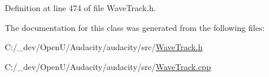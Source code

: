 Definition at line 474 of file Wave\+Track.\+h.



The documentation for this class was generated from the following files\+:\begin{DoxyCompactItemize}
\item 
C\+:/\+\_\+dev/\+Open\+U/\+Audacity/audacity/src/\hyperlink{_wave_track_8h}{Wave\+Track.\+h}\item 
C\+:/\+\_\+dev/\+Open\+U/\+Audacity/audacity/src/\hyperlink{_wave_track_8cpp}{Wave\+Track.\+cpp}\end{DoxyCompactItemize}
